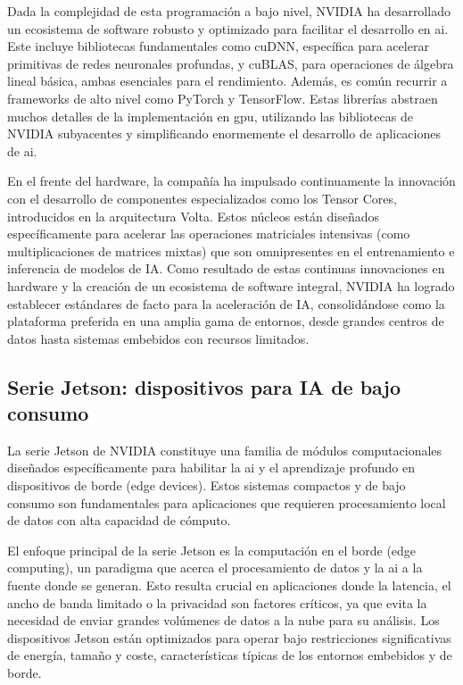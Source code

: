 \documentclass[11pt,spanish,listoffigures,listoftables]{tfgetsinf}
\begin{document}
Dada la complejidad de esta programación a bajo nivel, NVIDIA ha desarrollado un ecosistema de software robusto y optimizado para facilitar el desarrollo en \gls{ai}. Este incluye bibliotecas fundamentales como cuDNN, específica para acelerar primitivas de redes neuronales profundas, y cuBLAS, para operaciones de álgebra lineal básica, ambas esenciales para el rendimiento. Además, es común recurrir a frameworks de alto nivel como PyTorch y TensorFlow. Estas librerías abstraen muchos detalles de la implementación en \gls{gpu}, utilizando las bibliotecas de NVIDIA subyacentes y simplificando enormemente el desarrollo de aplicaciones de \gls{ai}.

En el frente del hardware, la compañía ha impulsado continuamente la innovación con el desarrollo de componentes especializados como los Tensor Cores, introducidos en la arquitectura Volta. Estos núcleos están diseñados específicamente para acelerar las operaciones matriciales intensivas (como multiplicaciones de matrices mixtas) que son omnipresentes en el entrenamiento e inferencia de modelos de IA. Como resultado de estas continuas innovaciones en hardware y la creación de un ecosistema de software integral, NVIDIA ha logrado establecer estándares de facto para la aceleración de IA, consolidándose como la plataforma preferida en una amplia gama de entornos, desde grandes centros de datos hasta sistemas embebidos con recursos limitados.


\subsection{Serie Jetson: dispositivos para IA de bajo consumo} \label{sec:jetson}
La serie Jetson de NVIDIA constituye una familia de módulos computacionales diseñados específicamente para habilitar la \gls{ai} y el aprendizaje profundo en dispositivos de borde (edge devices). Estos sistemas compactos y de bajo consumo son fundamentales para aplicaciones que requieren procesamiento local de datos con alta capacidad de cómputo.

El enfoque principal de la serie Jetson es la computación en el borde (edge computing), un paradigma que acerca el procesamiento de datos y la \gls{ai} a la fuente donde se generan. Esto resulta crucial en aplicaciones donde la latencia, el ancho de banda limitado o la privacidad son factores críticos, ya que evita la necesidad de enviar grandes volúmenes de datos a la nube para su análisis. Los dispositivos Jetson están optimizados para operar bajo restricciones significativas de energía, tamaño y coste, características típicas de los entornos embebidos y de borde.
\end{document}
